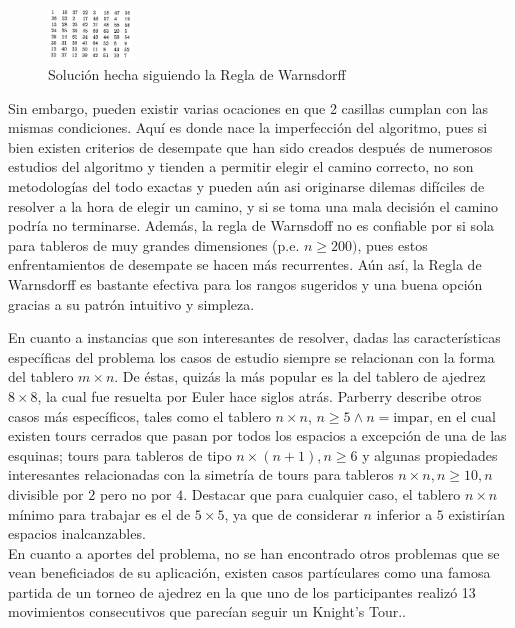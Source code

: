\documentclass[journal, 10pt]{IEEEtran}
\begin{document}
\begin{figure}[h]
\centering
\includegraphics[width=0.2\textwidth]{figures/warnsdorff.png}
\caption{Soluci\'on hecha siguiendo la Regla de Warnsdorff}
\label{fig:warnsdorff}
\end{figure}
Sin embargo, pueden existir varias ocaciones en que 2 casillas cumplan con las mismas condiciones. Aquí es donde nace la imperfección del algoritmo, pues si bien existen criterios de desempate que han sido creados después de numerosos estudios del algoritmo y tienden a permitir elegir el camino correcto, no son metodologías del todo exactas y pueden aún asi originarse dilemas difíciles de resolver a la hora de elegir un camino, y si se toma una mala decisión el camino podría no terminarse. Además, la regla de Warnsdoff no es confiable por si sola para tableros de muy grandes dimensiones (p.e. $n \geq 200)$, pues estos enfrentamientos de desempate se hacen más recurrentes. Aún así, la Regla de Warnsdorff es bastante efectiva para los rangos sugeridos y una buena opción gracias a su patrón intuitivo y simpleza.   


En cuanto a instancias que son interesantes de resolver, dadas las características específicas del problema los casos de estudio siempre se relacionan con la forma del tablero $m \times n$. De éstas, quizás la más popular es la del tablero de ajedrez $8 \times 8$, la cual fue resuelta por Euler \cite{Euler:1759} hace siglos atrás. Parberry \cite{Parberry:1997} describe otros casos más específicos, tales como el tablero $n \times n$, $n \ge 5 \wedge n=\text{impar}$, en el cual existen tours cerrados que pasan por todos los espacios a excepción de una de las esquinas; tours para tableros de tipo $n \times (n+1), n \ge 6$ y algunas propiedades interesantes relacionadas con la simetría de tours para tableros $n \times n, n \ge 10, n$ divisible por $2$ pero no por $4$. Destacar que para cualquier caso, el tablero $n \times n$ mínimo para trabajar es el de $5\times 5$, ya que de considerar $n$ inferior a $5$ existirían espacios inalcanzables.\\
En cuanto a aportes del problema, no se han encontrado otros problemas que se vean beneficiados de su aplicación, existen casos partículares como una famosa partida de un torneo de ajedrez en la que uno de los participantes realizó 13 movimientos consecutivos que parecían seguir un Knight's Tour.\cite{Shabazz:2010}.
\end{document}
